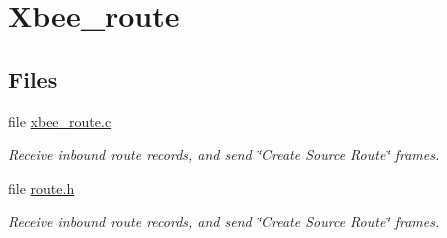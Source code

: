 \hypertarget{group__xbee__route}{}\section{Xbee\+\_\+route}
\label{group__xbee__route}
\subsection*{Files}
\begin{DoxyCompactItemize}
\item 
file \hyperlink{xbee__route_8c}{xbee\+\_\+route.\+c}
\begin{DoxyCompactList}\small\item\em Receive inbound route records, and send \char`\"{}\+Create Source Route\char`\"{} frames. \end{DoxyCompactList}\item 
file \hyperlink{route_8h}{route.\+h}
\begin{DoxyCompactList}\small\item\em Receive inbound route records, and send \char`\"{}\+Create Source Route\char`\"{} frames. \end{DoxyCompactList}\end{DoxyCompactItemize}
